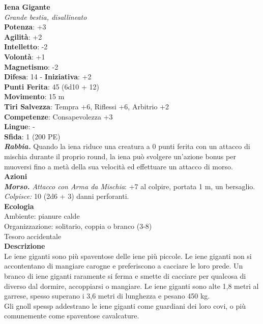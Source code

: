 \begin{multicols}{2}
\medskip\textbf{Iena Gigante}\\
\emph{Grande bestia, disallineato}\\
\textbf{Potenza}: +3\\
\textbf{Agilità}: +2\\
\textbf{Intelletto}: -2\\
\textbf{Volontà}: +1\\
\textbf{Magnetismo}: -2\\
\textbf{Difesa}: 14 - \textbf{Iniziativa}: +2\\
\textbf{Punti Ferita}: 45 (6d10 + 12)\\
\textbf{Movimento}: 15 m\\
\textbf{Tiri Salvezza}: Tempra +6, Riflessi +6, Arbitrio +2 \\
\textbf{Competenze}: Consapevolezza +3\\
\textbf{Lingue}: -\\
\textbf{Sfida}: 1 (200 PE)\smallskip\\
\emph{\textbf{Rabbia.}} Quando la iena riduce una creatura a 0 punti ferita con un attacco di mischia durante il proprio round, la iena può svolgere un'azione bonus per muoversi fino a metà della sua velocità ed effettuare un attacco di morso.\\
\smallskip\textbf{Azioni}\\
\emph{\textbf{Morso.} Attacco con Arma da Mischia}: +7 al colpire, portata 1 m, un bersaglio.\\
\emph{Colpisce:} 10 (2d6 + 3) danni perforanti.\\
\textbf{Ecologia}\\
Ambiente: pianure calde\\
Organizzazione: solitario, coppia o branco (3-8)\\
Tesoro accidentale\\
\textbf{Descrizione}\\
Le iene giganti sono più spaventose delle iene più piccole. Le iene giganti non si accontentano di mangiare carogne e preferiscono a cacciare le loro prede. Un branco di  iene giganti raramente si ferma e smette di cacciare per qualcosa di diverso dal dormire, accoppiarsi o mangiare. Le iene giganti sono alte 1,8 metri al garrese, spesso superano i 3,6 metri di lunghezza e pesano 450 kg.\\

Gli gnoll spessp addestrano le iene giganti come guardiani dei loro covi, o più comunemente come spaventose cavalcature.\\



\end{multicols}
